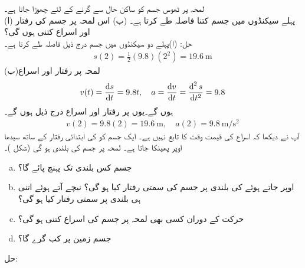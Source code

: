لمحہ  پر  ٹھوس جسم کو ساکن حال سے گرنے کے لئے چھوڑا جاتا ہے۔\\
(ا) پہلے  سیکنڈوں میں جسم کتنا فاصلہ طے کرتا ہے۔ (ب) اس لمحہ پر جسم کی رفتار اور اسراع کتنی ہوں گی؟\\
حل:\quad
(ا)\quad پہلے دو سیکنڈوں میں جسم درج ذیل فاصلہ طے کرتا ہے۔
\begin{align*}
s(2)=\frac{1}{2}(9.8)(2^2)=\SI{19.6}{\meter}
\end{align*}
(ب)\quad لمحہ  پر رفتار  اور اسراع  
\begin{align*}
v(t)=\frac{\dif s}{\dif t}=9.8 t,\quad a=\frac{\dif v}{\dif t}=\frac{\dif^{\,2}s}{\dif t^2}=9.8
\end{align*}
ہوں گے۔یوں  پر رفتار اور اسراع درج ذیل ہوں گے۔
\begin{align*}
v(2)=9.8(2)=\SI{19.6}{\meter},\quad a(2)=\SI{9.8}{\meter\per\second\squared}
\end{align*}
آپ نے دیکھا کہ اسراع  کی قیمت وقت  کا تابع نہیں ہے۔
ایک جسم کو  کی ابتدائی رفتار کے ساتھ سیدھا اوپر پھینکا جاتا ہے۔ لمحہ  پر جسم  کی بلندی   ہو گی (شکل )۔\\
\begin{enumerate}[a.]

\item
جسم کس بلندی تک پہنچ پائے گا؟
\item
اوپر جاتے ہوئے  کی بلندی پر جسم کی سمتی رفتار کیا ہو گی؟ نیچے آتے ہوئے اتنی ہی بلندی پر سمتی رفتار کیا ہو گی؟
\item
حرکت کے دوران کسی بھی لمحہ  پر جسم کی اسراع کتنی ہو گی؟ 
\item
جسم زمین پر کب گرے گا؟
\end{enumerate}
حل:
